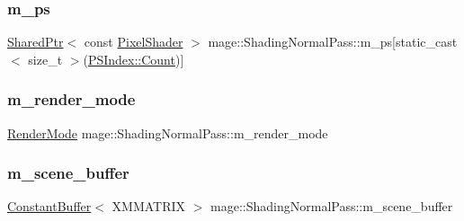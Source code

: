 \subsubsection{\texorpdfstring{m\+\_\+ps}{m\_ps}}
{\footnotesize\ttfamily \hyperlink{namespacemage_a1e01ae66713838a7a67d30e44c67703e}{Shared\+Ptr}$<$ const \hyperlink{namespacemage_ac98506b7edd999ea43ec46fbd0330238}{Pixel\+Shader} $>$ mage\+::\+Shading\+Normal\+Pass\+::m\+\_\+ps\mbox{[}static\+\_\+cast$<$ size\+\_\+t $>$(\hyperlink{classmage_1_1_shading_normal_pass_a6d277753d26a7854c448b3e0d9275b19ae93f994f01c537c4e2f7d8528c3eb5e9}{P\+S\+Index\+::\+Count})\mbox{]}\hspace{0.3cm}{\ttfamily [private]}}

\hypertarget{classmage_1_1_shading_normal_pass_a0048886bc80b9b39c1dc5d17e5b68584}{}\label{classmage_1_1_shading_normal_pass_a0048886bc80b9b39c1dc5d17e5b68584} 
\subsubsection{\texorpdfstring{m\+\_\+render\+\_\+mode}{m\_render\_mode}}
{\footnotesize\ttfamily \hyperlink{namespacemage_a5e7e18b0154373ce8fc942fe3f6b27fd}{Render\+Mode} mage\+::\+Shading\+Normal\+Pass\+::m\+\_\+render\+\_\+mode\hspace{0.3cm}{\ttfamily [private]}}

\hypertarget{classmage_1_1_shading_normal_pass_a98f3cd5d6abc9c3b5e904311722349df}{}\label{classmage_1_1_shading_normal_pass_a98f3cd5d6abc9c3b5e904311722349df} 
\subsubsection{\texorpdfstring{m\+\_\+scene\+\_\+buffer}{m\_scene\_buffer}}
{\footnotesize\ttfamily \hyperlink{structmage_1_1_constant_buffer}{Constant\+Buffer}$<$ X\+M\+M\+A\+T\+R\+IX $>$ mage\+::\+Shading\+Normal\+Pass\+::m\+\_\+scene\+\_\+buffer\hspace{0.3cm}{\ttfamily [private]}}

